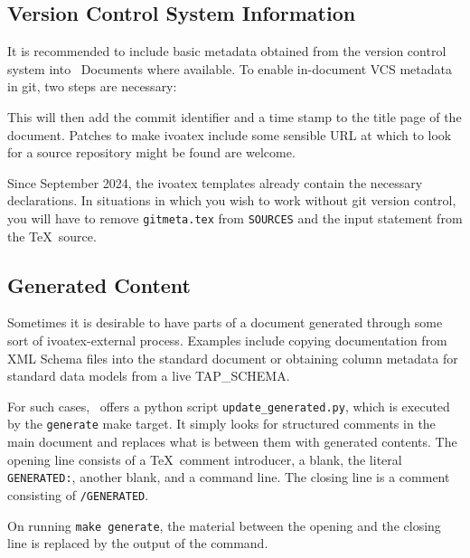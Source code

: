 \documentclass[11pt,a4paper]{ivoa}
\begin{document}
\subsection{Version Control System Information}
\label{sect:vcs}

It is recommended to include basic metadata obtained from the version
control system into \ivoatex~Documents where available.
To enable in-document VCS metadata in git, two steps are necessary:


This will then add the commit identifier and a time stamp to the title
page of the document.  Patches to make ivoatex include some sensible URL
at which to look for a source repository might be found are welcome.

Since September 2024, the ivoatex templates already contain the
necessary declarations.  In situations in which you wish to work without
git version control, you will have to remove \verb|gitmeta.tex| from
\verb|SOURCES| and the input statement from the \TeX~source.

\subsection{Generated Content}
\label{sect:generated}

Sometimes it is desirable to have parts of a document generated through
some sort of ivoatex-external process.  Examples include copying
documentation from XML Schema files into the standard document
or obtaining column metadata for standard
data models from a live TAP\_SCHEMA.

For such cases, \ivoatex\ offers a python script
\texttt{update\_generated.py}, which is executed by the
\texttt{generate} make target.  It simply looks for structured comments
in the main document and replaces what is between them with generated
contents.  The opening line consists of a \TeX~comment introducer, a
blank, the literal \texttt{GENERATED:}, another blank, and a command
line.  The closing line is a comment consisting of \texttt{/GENERATED}.

On running \texttt{make generate}, the material between the opening and
the closing line is replaced by the output of the command.
\end{document}
